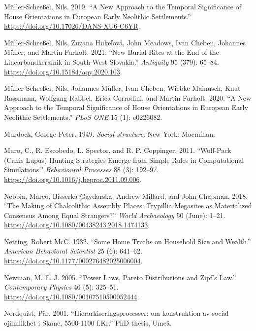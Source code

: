 \documentclass[
  12pt,
  a4paper, twoside]{book}
\newlength{\cslhangindent}
\newlength{\cslentryspacingunit} %
\newenvironment{CSLReferences}[2] %
 {%
  \setlength{\parindent}{0pt}
  \ifodd #1
  \let\oldpar\par
  \def\par{\hangindent=\cslhangindent\oldpar}
  \fi
  \setlength{\parskip}{#2\cslentryspacingunit}
 }%
 {}
\begin{document}
\begin{CSLReferences}{1}{0}
\leavevmode{}%
Müller-Scheeßel, Nils. 2019. {``A New Approach to the Temporal Significance of House Orientations in European Early Neolithic Settlements.''} \url{https://doi.org/10.17026/DANS-XU6-C6YR}.

\leavevmode{}%
Müller-Scheeßel, Nils, Zuzana Hukeľová, John Meadows, Ivan Cheben, Johannes Müller, and Martin Furholt. 2021. {``New Burial Rites at the End of the {Linearbandkeramik} in South-West {Slovakia}.''} \emph{Antiquity} 95 (379): 65--84. \url{https://doi.org/10.15184/aqy.2020.103}.

\leavevmode{}%
Müller-Scheeßel, Nils, Johannes Müller, Ivan Cheben, Wiebke Mainusch, Knut Rassmann, Wolfgang Rabbel, Erica Corradini, and Martin Furholt. 2020. {``A New Approach to the Temporal Significance of House Orientations in European Early Neolithic Settlements.''} \emph{PLoS ONE} 15 (1): e0226082.

\leavevmode{}%
Murdock, George Peter. 1949. \emph{Social structure}. New York: Macmillan.

\leavevmode{}%
Muro, C., R. Escobedo, L. Spector, and R. P. Coppinger. 2011. {``Wolf-Pack (Canis Lupus) Hunting Strategies Emerge from Simple Rules in Computational Simulations.''} \emph{Behavioural Processes} 88 (3): 192--97. \url{https://doi.org/10.1016/j.beproc.2011.09.006}.

\leavevmode{}%
Nebbia, Marco, Bisserka Gaydarska, Andrew Millard, and John Chapman. 2018. {``The Making of Chalcolithic Assembly Places: Trypillia Megasites as Materialized Consensus Among Equal Strangers?''} \emph{World Archaeology} 50 (June): 1--21. \url{https://doi.org/10.1080/00438243.2018.1474133}.

\leavevmode{}%
Netting, Robert McC. 1982. {``Some Home Truths on Household Size and Wealth.''} \emph{American Behavioral Scientist} 25 (6): 641--62. \url{https://doi.org/10.1177/000276482025006004}.

\leavevmode{}%
Newman, M. E. J. 2005. {``Power Laws, Pareto Distributions and Zipf's Law.''} \emph{Contemporary Physics} 46 (5): 325--51. \url{https://doi.org/10.1080/00107510500052444}.

\leavevmode{}%
Nordquist, Pär. 2001. {``Hierarkiseringsprocesser: om konstruktion av social ojämlikhet i Skåne, 5500-1100 f.Kr.''} PhD thesis, Umeå.


\end{CSLReferences}
\end{document}
